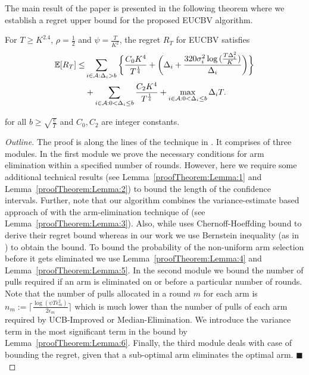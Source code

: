 The main result of the paper is presented in the following theorem where we establish a regret upper bound for the proposed EUCBV  algorithm. 
\begin{theorem}
\label{Result:Theorem:1}
For $T\geq K^{2.4}$, $\rho=\frac{1}{2}$ and $\psi=\frac{T}{K^2}$, the regret $R_T$ for EUCBV satisfies
\begin{align*}
\mathbb{E} [R_{T}] \leq &\sum\limits_{i\in \mathcal{A} :\Delta_{i} > b}\bigg\lbrace \dfrac{C_0 K^{4}}{T^{\frac{1}{4}}} + \bigg(\Delta_{i}+\dfrac{320\sigma_i^2\log{(\frac{T\Delta_{i}^{2}}{K})}}{\Delta_{i}}\bigg)\bigg \rbrace\\ 
  & +\sum\limits_{i\in \mathcal{A} :0 < \Delta_{i}\leq b} \dfrac{C_2 K^{4}}{T^{\frac{1}{4}}} + \max_{i\in \mathcal{A} :0 < \Delta_{i}\leq b}\Delta_{i}T.
\end{align*}

for all $b\geq\sqrt{\frac{e}{T}}$ and $C_0, C_2$ are integer constants. 
\end{theorem}

\begin{proof}[Outline]
The proof is along the lines of the technique in \citet{auer2010ucb}. It comprises of three modules. In the first module we prove the necessary conditions for arm elimination within a specified number of rounds. However, here we require some additional technical results (see Lemma~\ref{proofTheorem:Lemma:1} and Lemma~\ref{proofTheorem:Lemma:2}) to bound the length of the confidence intervals. Further, note that our algorithm combines the variance-estimate based approach of \citet{audibert2009exploration} with the arm-elimination technique of \citet{auer2010ucb} (see Lemma~\ref{proofTheorem:Lemma:3}). Also, while \citet{auer2010ucb} uses Chernoff-Hoeffding bound to derive their regret bound whereas in our work we use  Bernstein inequality (as in \citet{audibert2009exploration}) to obtain the bound. To bound the probability of the non-uniform arm selection before it gets eliminated we use Lemma~\ref{proofTheorem:Lemma:4} and Lemma~\ref{proofTheorem:Lemma:5}. In the second module we bound the number of pulls required if an arm is eliminated on or before a particular number of rounds. Note that the number of pulls allocated in a round $m$ for each arm is $n_{m}:=\bigg\lceil\frac{\log{(\psi T\epsilon_{m}^{2})}}{2\epsilon_{m}}\bigg\rceil$ which is much lower than the number of pulls of each arm required by UCB-Improved or Median-Elimination. We introduce the variance term in the most significant term in the bound by Lemma~\ref{proofTheorem:Lemma:6}. Finally, the third module deals with case of bounding the regret, given that a sub-optimal arm eliminates the optimal arm.
\hfill $\blacksquare$
\end{proof}

